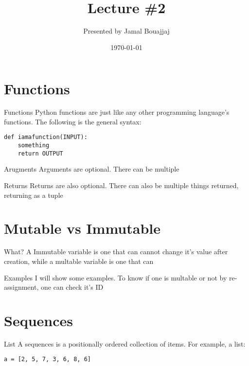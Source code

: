 \documentclass[10pt]{beamer}
\title{Lecture \#2}
\date{\today}
\author{Presented by Jamal Bouajjaj}
\institute{For University of New Haven's Fall 2023 CSCIxx51 Course}
\begin{document}
\maketitle

\section{Functions}
\begin{frame}[containsverbatim]{Functions}
    Python functions are just like any other programming language's functions. The following is the general syntax:

    \begin{verbatim}
def iamafunction(INPUT):
    something
    return OUTPUT
    \end{verbatim}
\end{frame}

\begin{frame}{Arugments}
    Arguments are optional. There can be multiple
\end{frame}

\begin{frame}{Returns}
    Returns are also optional. There can also be multiple things returned, returning as a tuple
\end{frame}

\section{Mutable vs Immutable}
\begin{frame}[containsverbatim]{What?}
    A Immutable variable is one that can cannot change it's value after creation, while a multable variable is one that can
\end{frame}

\begin{frame}[containsverbatim]{Examples}
    I will show some examples. To know if one is multable or not by re-assignment, one can check it's ID
\end{frame}

\section{Sequences}

\begin{frame}[containsverbatim]{List}
    A sequences is a positionally ordered collection of items. For example, a list:
    \begin{verbatim}
a = [2, 5, 7, 3, 6, 8, 6]
    \end{verbatim}
\end{frame}
\end{document}
